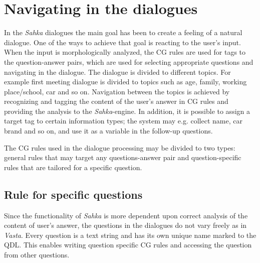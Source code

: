 \documentclass[11pt]{article}
\begin{document}
\section{Navigating in the dialogues}

In the \textit{Sahka} dialogues the main goal has been to create a feeling of a natural dialogue. One of the ways to achieve that goal is reacting to the user's input. When the input is morphologically analyzed, the CG rules are used for tags to the question-answer pairs, which are used for selecting appropriate questions and navigating in the dialogue. The dialogue is divided to different topics. For example first meeting dialogue is divided to topics such as age, family, working place/school, car and so on. Navigation between the topics is achieved by recognizing and tagging the content of the user's answer in CG rules and providing the analysis to the \textit{Sahka}-engine.  In addition, it is possible to assign a target tag to certain information types; the system may e.g. collect name, car brand and so on, and use it as a variable in the follow-up questions. 

The CG rules used in the dialogue processing may be divided to two types: general rules that may target any questions-answer pair and question-specific rules that are tailored for a specific question. %


\subsection{Rule for specific questions}
Since the functionality of \textit{Sahka} is more dependent upon correct analysis of the content of user's answer, the questions in the dialogues do not vary freely as in \textit{Vasta}. Every question is a text string and has its own unique name marked to the QDL.  This enables writing question specific CG rules and accessing the question from other questions. \\ 
\end{document}
